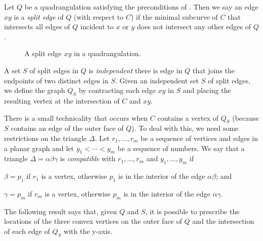\documentclass{patmorin}
\begin{document}
Let $Q$ be a quadrangulation satisfying the preconditions of
. Then we say an edge $xy$ is a \emph{split edge} of $Q$
(with respect to $C$) if the minimal subcurve of $C$ that intersects all
edges of $Q$ incident to $x$ or $y$ does not intersect any other edges
of $Q$.
\begin{figure}
   \caption{A split edge $xy$ in a quadrangulation.}
\end{figure}
A set $S$ of split edges in $Q$ is \emph{independent} there is edge in
$Q$ that joins the endpoints of two distinct edges in $S$.  Given an
independent set $S$ of split edges, we define the graph $Q_S$ by
contracting each edge $xy$ in $S$ and placing the resulting vertex at
the intersection of $C$ and $xy$.  

There is a small technicality that occurs when $C$ contains a vertex
of $Q_S$ (because $S$ contains an edge of the outer face of $Q$).
To deal with this, we need some restrictions on the triangle $\Delta$.
Let $r_1,\ldots,r_m$ be a sequence of vertices and edges in a planar graph
and let $y_1<\cdots<y_m$ be a sequence of numbers.  We say that a triangle
$\Delta=\alpha\beta\gamma$ is \emph{compatible} with $r_1,\ldots,r_m$
and $y_1,\ldots,y_m$ if
\begin{compactenum}
  \item $\beta=p_1$ if $r_1$ is a vertex, otherwise $p_1$ is in the interior
  of the edge $\alpha\beta$; and
  \item $\gamma=p_m$ if $r_m$ is a vertex, otherwise $p_m$ is in the interior
  of the edge $\alpha\gamma$.
\end{compactenum}

The following result says that, given $Q$ and $S$, it is possible to
prescribe the locations of the three convex vertices on the outer face
of $Q$ and the intersection of each edge of $Q_S$ with the y-axis.  
\end{document}
